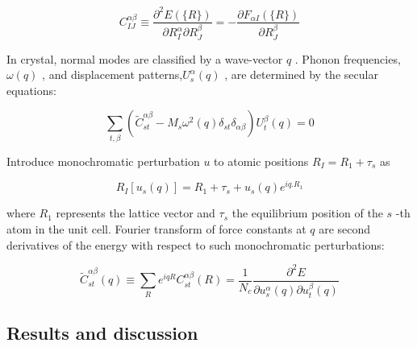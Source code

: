  \begin{equation}
 C_{IJ}^{\alpha\beta} \equiv \frac{\partial^{2} E (\{R\})}{\partial R_{I}^{\alpha} \partial R_{J}^{\beta}} = - \frac{\partial F_{\alpha I} (\{R\})}{\partial R_{J}^{\beta}}
 \end{equation}
 
 In crystal, normal modes are classified by a wave-vector $q$ . Phonon frequencies,$\omega(q)$ , and displacement patterns,$U_{s}^{\alpha} (q)$ , are determined by the secular equations:
 
 \begin{equation}
 \sum_{t, \beta} \left( \tilde{C}_{st}^{\alpha\beta} - M_{s} \omega^{2}(q) \delta_{st} \delta_{\alpha\beta}\right) U_{t}^{\beta} (q) = 0
\end{equation}
 
 Introduce monochromatic perturbation $u$ to atomic positions $R_{I} = R_{1} + \tau_{s}$ as
 
 \begin{equation}
 R_{I} [u_{s}(q)] = R_{1} + \tau_{s} + u_{s} (q)e^{iq.R_{1}}
 \end{equation}
 
 where $R_{1}$ represents the lattice vector and $\tau_{s}$ the equilibrium position of the $s$ -th atom in the unit cell.
 Fourier transform of force constants at $q$ are second derivatives of the energy with respect to such monochromatic perturbations:
 
 \begin{equation}
 \tilde{C}_{st}^{\alpha\beta} (q) \equiv \sum_{R} e^{iqR} C_{st}^{\alpha\beta} (R) = \frac{1}{N_{c}} \frac{\partial ^{2} E}{\partial u_{s}^{\alpha} (q) \partial u_{t}^{\beta} (q)}
 \end{equation}
 
 
 
 \subsection{Results and discussion}
 
